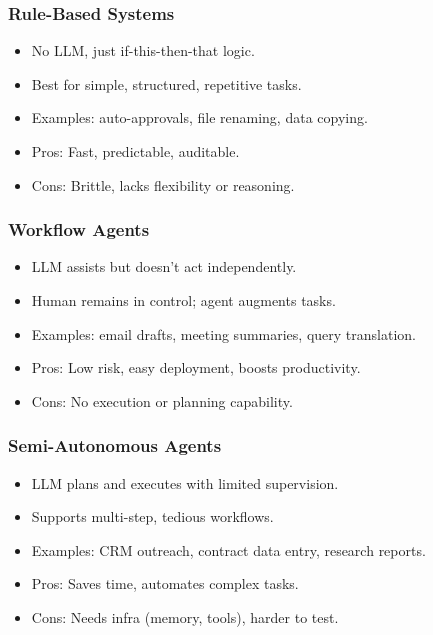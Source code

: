 \begin{frame}[fragile]\frametitle{Rule-Based Systems}
    \begin{itemize}
        \item No LLM, just if-this-then-that logic.
        \item Best for simple, structured, repetitive tasks.
        \item Examples: auto-approvals, file renaming, data copying.
        \item Pros: Fast, predictable, auditable.
        \item Cons: Brittle, lacks flexibility or reasoning.
    \end{itemize}
\end{frame}

\begin{frame}[fragile]\frametitle{Workflow Agents}
    \begin{itemize}
        \item LLM assists but doesn't act independently.
        \item Human remains in control; agent augments tasks.
        \item Examples: email drafts, meeting summaries, query translation.
        \item Pros: Low risk, easy deployment, boosts productivity.
        \item Cons: No execution or planning capability.
    \end{itemize}
\end{frame}

\begin{frame}[fragile]\frametitle{Semi-Autonomous Agents}
    \begin{itemize}
        \item LLM plans and executes with limited supervision.
        \item Supports multi-step, tedious workflows.
        \item Examples: CRM outreach, contract data entry, research reports.
        \item Pros: Saves time, automates complex tasks.
        \item Cons: Needs infra (memory, tools), harder to test.
    \end{itemize}
\end{frame}

